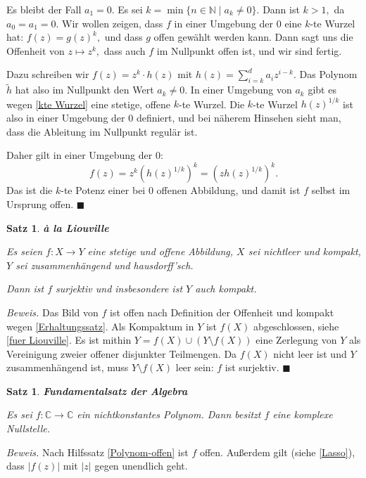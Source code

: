 \documentclass[12pt]{scrbook}   %
\newtheorem{satzX}[alles]{Satz}
\newenvironment{satz}[1]{\begin{satzX}{\bf #1}\par}{\end{satzX}}
\begin{document}
Es bleibt der Fall $a_1=0.$ Es sei $k=\min\{n\in \mathbb N \mid a_k\neq 0\}.$
Dann ist $k>1,$ da $a_0=a_1=0.$ Wir wollen zeigen, dass $f$ in einer Umgebung
der $0$ eine $k$-te Wurzel hat: $f(z) = g(z)^k,$ und dass $g$ offen gewählt 
werden kann. Dann sagt uns die Offenheit von $z\mapsto z^k,$ dass auch $f$ im
Nullpunkt offen ist, und wir sind fertig.

Dazu schreiben wir $f(z) = z^k\cdot h(z)$ mit 
$h(z) = \sum_{i=k}^d a_i z^{i-k}.$
Das Polynom $\tilde h$ hat also im Nullpunkt den Wert $a_k\neq 0.$
In einer Umgebung von $a_k$ gibt es wegen \ref{kte Wurzel} eine stetige, offene 
$k$-te Wurzel. Die $k$-te Wurzel $h(z)^{1/k}$ ist also in einer Umgebung der $0$
definiert, und bei näherem Hinsehen sieht man, dass die Ableitung im 
Nullpunkt regulär ist.

Daher gilt in einer Umgebung der $0:$ 
$$f(z) = z^k (h(z)^{1/k})^k = (z h(z)^{1/k})^k.$$ 
Das ist die $k$-te Potenz einer bei $0$ offenen Abbildung, und damit ist $f$ 
selbst im Ursprung offen.
\hfill{$\blacksquare$}

\begin{satz}{\`a la Liouville}
\label{Liouville}

Es seien $f:X\longrightarrow Y$ eine stetige und offene Abbildung, $X$ sei 
nichtleer und kompakt, $Y$ sei zusammenhängend und hausdorff'sch.

Dann ist $f$ surjektiv und insbesondere ist $Y$ auch kompakt.

\end{satz}

{\it Beweis.} Das Bild von $f$ ist offen nach Definition der Offenheit und
kompakt wegen \ref{Erhaltungssatz}. Als Kompaktum in $Y$ ist $f(X)$ 
abgeschlossen, siehe \ref{fuer Liouville}. Es ist mithin 
$Y= f(X) \cup (Y\setminus f(X))$ eine Zerlegung von $Y$ als Vereinigung
zweier offener disjunkter Teilmengen. Da $f(X)$ nicht leer ist und $Y$
zusammenhängend ist, muss $Y\setminus f(X)$ leer sein: $f$ ist 
surjektiv. \hfill{$\blacksquare$}

\begin{satz}{Fundamentalsatz der Algebra}
 \label{Fundamentalsatz} 

Es sei $f:\mathbb C\longrightarrow \mathbb C$ ein nichtkonstantes Polynom. 
Dann besitzt $f$ eine komplexe Nullstelle.

\end{satz}

{\it Beweis.} Nach Hilfssatz \ref{Polynom-offen} ist $f$ offen. Außerdem 
gilt (siehe \ref{Lasso}), dass $|f(z)|$ mit $|z|$ gegen unendlich geht. 
\end{document}
